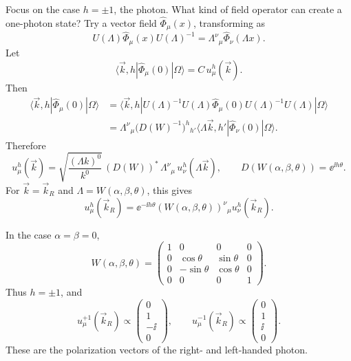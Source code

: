 Focus on the case \(h=\pm1\), the photon.  What kind of field operator can
create a one-photon state?  Try a vector field \(\widehat\Phi_\mu(x)\),
transforming as
\[
  U(\Lambda)\widehat\Phi_\mu(x)U(\Lambda)^{-1}
  =
  \Lambda^\nu{}_\mu\widehat\Phi_\nu(\Lambda x).
\]
Let
\[
  \langle\vec k,h|\widehat\Phi_\mu(0)|\Omega\rangle
  =
  C\,u_\mu^h(\vec k).
\]
Then
\[
\begin{aligned}
  \langle\vec k,h|\widehat\Phi_\mu(0)|\Omega\rangle
  &=
  \langle\vec k,h|
  U(\Lambda)^{-1}U(\Lambda)\widehat\Phi_\mu(0)
  U(\Lambda)^{-1}U(\Lambda)
  |\Omega\rangle  \\
  &=
  \Lambda^\nu{}_\mu
  \bigl(D(W)^{-1}\bigr)^h{}_{h'}
  \langle\Lambda\vec k,h'|\widehat\Phi_\nu(0)|\Omega\rangle .
\end{aligned}
\]
Therefore
\[
  u_\mu^h(\vec k)
  =
  \sqrt{\frac{(\Lambda k)^0}{k^0}}\,
  (D(W))^*\,\Lambda^\nu{}_\mu\,u_\nu^h(\Lambda\vec k),
  \qquad
  D(W(\alpha,\beta,\theta))=\ee^{\ii h\theta}.
\]
For \(\vec k=\vec k_R\) and \(\Lambda=W(\alpha,\beta,\theta)\), this gives
\[
  u_\mu^h(\vec k_R)
  =
  \ee^{-\ii h\theta}
  (W(\alpha,\beta,\theta))^\nu{}_\mu u_\nu^h(\vec k_R).
\]

In the case \(\alpha=\beta=0\),
\[
  W(\alpha,\beta,\theta)
  =
  \begin{pmatrix}
    1&0&0&0\\
    0&\cos\theta&\sin\theta&0\\
    0&-\sin\theta&\cos\theta&0\\
    0&0&0&1
  \end{pmatrix}.
\]
Thus \(h=\pm1\), and
\[
  u_\mu^{+1}(\vec k_R)
  \propto
  \begin{pmatrix}0\\1\\-\ii\\0\end{pmatrix},
  \qquad
  u_\mu^{-1}(\vec k_R)
  \propto
  \begin{pmatrix}0\\1\\\ii\\0\end{pmatrix}.
\]
These are the polarization vectors of the right- and left-handed photon.

